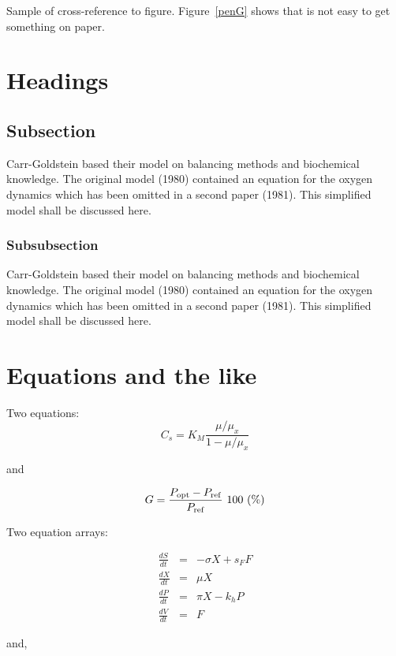 \documentclass[ejs]{imsart}
\numberwithin{equation}{section}
\theoremstyle{plain}
\theoremstyle{definition}
\theoremstyle{remark}
\begin{document}
Sample of cross-reference to figure.
Figure~\ref{penG} shows that is not easy to get something on paper.

\section{Headings}

\subsection{Subsection}
Carr-Goldstein based their model on balancing methods and
biochemical know\-ledge. The original model (1980) contained an equation for the
oxygen dynamics which has been omitted in a second paper
(1981). This simplified model shall be discussed here.

\subsubsection{Subsubsection}
Carr-Goldstein
based their model on balancing methods and
biochemical know\-ledge. The original model (1980) contained an equation for the
oxygen dynamics which has been omitted in a second paper
(1981). This simplified model shall be discussed here.

\section{Equations and the like}

Two equations:
\begin{equation}
    C_{s}  =  K_{M} \frac{\mu/\mu_{x}}{1-\mu/\mu_{x}} \label{ccs}
\end{equation}

and

\begin{equation}
    G = \frac{P_{\rm opt} - P_{\rm ref}}{P_{\rm ref}} \mbox{\ }100 \mbox{\ }(\%)
\end{equation}

Two equation arrays:

\begin{eqnarray}
  \frac{dS}{dt} & = & - \sigma X + s_{F} F\\
  \frac{dX}{dt} & = &   \mu    X\\
  \frac{dP}{dt} & = &   \pi    X - k_{h} P\\
  \frac{dV}{dt} & = &   F
\end{eqnarray}

and,
\end{document}
